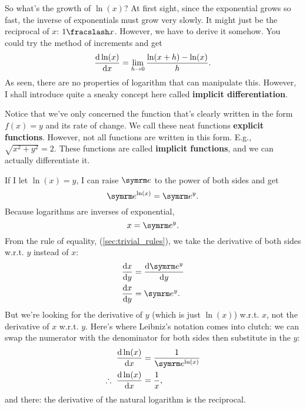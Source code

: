 So what's the growth of $\ln(x)$? At first sight, since the exponential grows so fast, the inverse of exponentials must grow very slowly. It might just be the reciprocal of $x$: $\flatfrac{1}{x}$. However, we have to derive it somehow. You could try the method of increments and get
\begin{equation}
    \odv{\ln(x)}{x} = \lim_{h \appr 0}\frac{\ln(x + h) - \ln(x)}{h}.
\end{equation}
As seen, there are no properties of logarithm that can manipulate this. However, I shall introduce quite a sneaky concept here called \textbf{implicit differentiation}.

Notice that we've only concerned the function that's clearly written in the form $f(x) = y$ and its rate of change. We call these neat functions \textbf{explicit functions}. However, not all functions are written in this form. E.g., $\sqrt{x^2 + y^2} = 2$. These functions are called \textbf{implicit functions}, and we can actually differentiate it.

If I let $\ln(x) = y$, I can raise $\e$ to the power of both sides and get
\begin{equation}
    \e^{\ln(x)} = \e^y.
\end{equation}
Because logarithms are inverses of exponential,
\begin{equation}
    x = \e^y.
\end{equation}
From the rule of equality, (\cref{sec:trivial_rules}), we take the derivative of both sides w.r.t. $y$ instead of $x$:
\begin{align*}
    \odv{x}{y} &= \odv{\e^y}{y} \\
    \odv{x}{y} &= \e^y.
\end{align*}
But we're looking for the derivative of $y$ (which is just $\ln(x)$) w.r.t. $x$, not the derivative of $x$ w.r.t. $y$. Here's where Leibniz's notation comes into clutch: we can swap the numerator with the denominator for both sides then substitute in the $y$:
\begin{align*}
    \odv{\ln(x)}{x} &= \frac{1}{\e^{\ln(x)}} \\
    \therefore~\odv{\ln(x)}{x} &= \frac{1}{x},
\end{align*}
and there: the derivative of the natural logarithm is the reciprocal.

